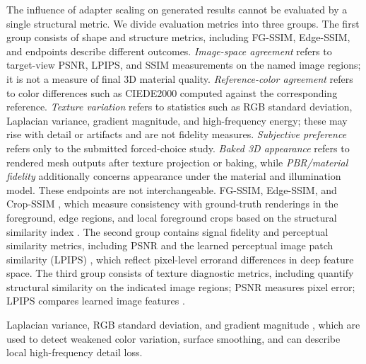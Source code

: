 \documentclass[times,twocolumn,final]{elsarticle}
\providecommand{\DIFadd}[1]{{\protect\color{blue} \sf #1}} %
\providecommand{\DIFdel}[1]{{\protect\color{red} \scriptsize #1}} %
\providecommand{\DIFaddbegin}{} %
\providecommand{\DIFaddend}{} %
\providecommand{\DIFdelbegin}{} %
\providecommand{\DIFdelend}{} %
\begin{document}
The \DIFdelbegin \DIFdel{influence of adapter scaling on generated results cannot be evaluated by a single structural metric. We divide evaluation metrics into three groups. The first group consists of shape and structure metrics, including FG-SSIM, Edge-SSIM, and }\DIFdelend \DIFaddbegin \DIFadd{endpoints describe different outcomes. \emph{Image-space agreement} refers to target-view PSNR, LPIPS, and SSIM measurements on the named image regions; it is not a measure of final 3D material quality. \emph{Reference-color agreement} refers to color differences such as CIEDE2000 computed against the corresponding reference. \emph{Texture variation} refers to statistics such as RGB standard deviation, Laplacian variance, gradient magnitude, and high-frequency energy; these may rise with detail or artifacts and are not fidelity measures. \emph{Subjective preference} refers only to the submitted forced-choice study. \emph{Baked 3D appearance} refers to rendered mesh outputs after texture projection or baking, while \emph{PBR/material fidelity} additionally concerns appearance under the material and illumination model. These endpoints are not interchangeable. FG-SSIM, Edge-SSIM, and }\DIFaddend Crop-SSIM \DIFdelbegin \DIFdel{, which measure consistency with ground-truth renderings in the foreground, edge regions, and local foreground crops based on the structural similarity index \cite{wang2004ssim}. The second group contains signal fidelity and perceptual similarity metrics, including PSNR and the learned perceptual image patch similarity (LPIPS) \cite{zhang2018lpips}, which reflect pixel-level errorand differences in deep feature space.
The third group consists of texture diagnostic metrics, including }\DIFdelend \DIFaddbegin \DIFadd{quantify structural similarity on the indicated image regions; PSNR measures pixel error; LPIPS compares learned image features \cite{wang2004ssim,zhang2018lpips}.
}

\DIFaddend Laplacian variance, RGB standard deviation, and gradient magnitude \DIFdelbegin \DIFdel{, which are used to detect weakened color variation, surface smoothing, and }\DIFdelend \DIFaddbegin \DIFadd{can describe local }\DIFaddend high-frequency \DIFdelbegin \DIFdel{detail loss. }%
\end{document}
